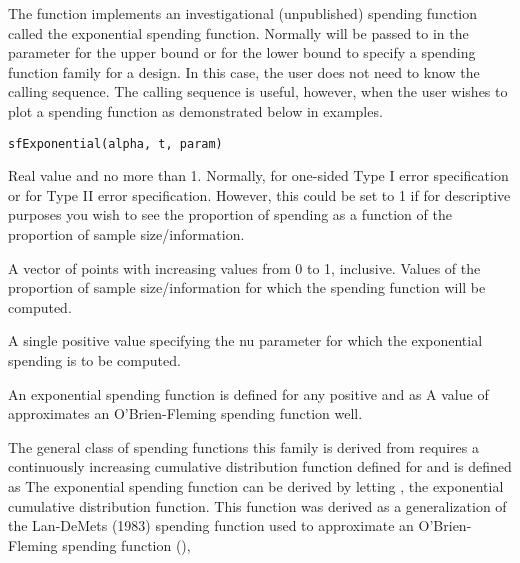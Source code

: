 \begin{Description}\relax
The function  implements an investigational (unpublished) spending function called the exponential
spending function.
Normally  will be passed to  in the parameter  for the upper bound or
 for the lower bound to specify a spending function family for a design.
In this case, the user does not need to know the calling sequence.
The calling sequence is useful, however, when the user wishes to plot a spending function as demonstrated below
in examples.
\end{Description}
\begin{Usage}
\begin{verbatim}
sfExponential(alpha, t, param)
\end{verbatim}
\end{Usage}
\begin{Arguments}
\begin{ldescription}
\item[\code{alpha}] Real value  and no more than 1. Normally, 
 for one-sided Type I error specification
or  for Type II error specification. However, this could be set to 1 if for descriptive purposes
you wish to see the proportion of spending as a function of the proportion of sample size/information.
\item[\code{t}] A vector of points with increasing values from 0 to 1, inclusive. Values of the proportion of 
sample size/information for which the spending function will be computed.
\item[\code{param}] A single positive value specifying the nu parameter for which the exponential spending
is to be computed.
\end{ldescription}
\end{Arguments}
\begin{Details}\relax
An  exponential spending function is defined for any positive  and  as
A value of  approximates an O'Brien-Fleming spending function well.

The general class of spending functions this family is derived from requires a continuously increasing 
cumulative distribution function defined for  and is defined as
The exponential spending function can be derived by letting , the exponential cumulative distribution function.
This function was derived as a generalization of the Lan-DeMets (1983) spending function used to approximate an
O'Brien-Fleming spending function (),
\end{Details}
